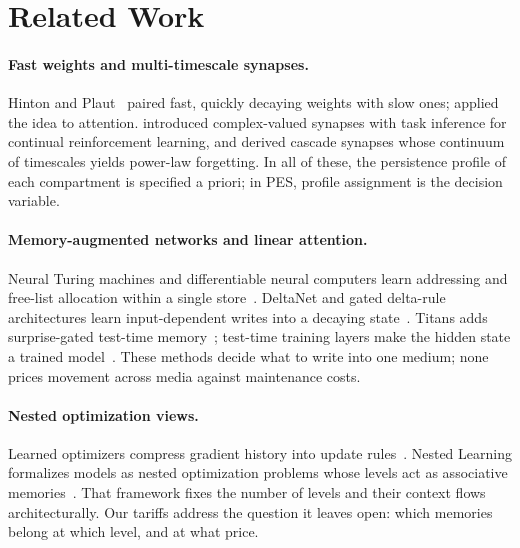 \documentclass[11pt]{article}
\begin{document}
\section{Related Work}
\label{sec:related}

\paragraph{Fast weights and multi-timescale synapses.}
Hinton and Plaut~\citep{hinton1987fast} paired fast, quickly decaying weights with slow ones;
\citet{ba2016using} applied the idea to attention. \citet{kaplanis2018complex} introduced
complex-valued synapses with task inference for continual reinforcement learning, and
\citet{benna2016synaptic} derived cascade synapses whose continuum of timescales yields power-law
forgetting. In all of these, the persistence profile of each compartment is specified a priori; in PES,
profile assignment is the decision variable.

\paragraph{Memory-augmented networks and linear attention.}
Neural Turing machines and differentiable neural computers learn addressing and free-list allocation
within a single store~\citep{graves2014neural,graves2016hybrid}. DeltaNet and gated delta-rule
architectures learn input-dependent writes into a decaying state~\citep{schlag2021linear,yang2024gated}.
Titans adds surprise-gated test-time memory~\citep{behrouz2024titans}; test-time training layers make
the hidden state a trained model~\citep{sun2024testtime}. These methods decide what to write into one
medium; none prices movement across media against maintenance costs.

\paragraph{Nested optimization views.}
Learned optimizers compress gradient history into update rules~\citep{veeriah2021discovery}. Nested
Learning formalizes models as nested optimization problems whose levels act as associative
memories~\citep{behrouz2025nested}. That framework fixes the number of levels and their context flows
architecturally. Our tariffs address the question it leaves open: which memories belong at which level,
and at what price.
\end{document}

